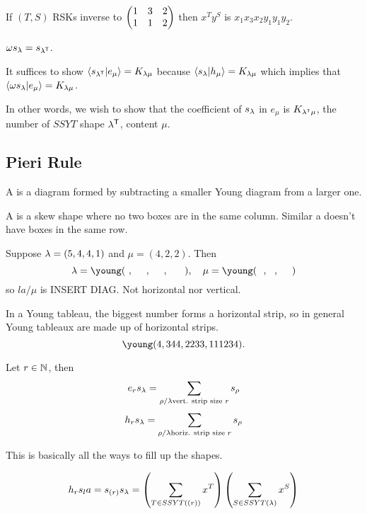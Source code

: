\documentclass[12pt]{memoir}
\begin{document}
If $(T,S)$ RSKs inverse to $\begin{pmatrix} 1 & 3 & 2\\ 1 & 1 & 2 \end{pmatrix}$ then $x^Ty^S$ is $x_1x_3x_2y_1y_1y_2$.

\begin{Cor}
    $\omega s_\lambda=s_{\lambda^{\mathsf{T}}}$. 
\end{Cor}

\begin{ptcbp}
    It suffices to show $\braket{s_{\lambda^{\mathsf{T}}}}{e_\mu}=K_{\lambda\mu}$ because $\braket{s_\lambda}{h_\mu}=K_{\lambda\mu}$ which implies that $\braket{\omega s_\lambda}{e_\mu}=K_{\lambda\mu}$.\par 
    In other words, we wish to show that the coefficient of $s_\lambda$ in $e_\mu$ is $K_{\lambda^{\mathsf{T}}\mu}$, the number of $SSYT$ shape $\lambda^{\mathsf{T}}$, content $\mu$.\par 
{}
\end{ptcbp}

\subsection*{Pieri Rule}

\begin{Def}
    A  is a diagram formed by subtracting a smaller Young diagram from a larger one.\par 
    A  is a skew shape where no two boxes are in the same column. Similar a  doesn't have boxes in the same row.
\end{Def}

\begin{Ex}
    Suppose $\lambda=(5,4,4,1)$ and $\mu=(4,2,2)$. Then 
    $$\la=\young(~,~~~~,~~~~,~~~~~),\quad \mu=\young(~~,~~,~~~~)$$
    so $la/\mu$ is INSERT DIAG.
    Not horizontal nor vertical.
\end{Ex}

In a Young tableau, the biggest number forms a horizontal strip, so in general Young tableaux are made up of horizontal strips.
$$\young(4,344,2233,111234).$$

\begin{Th}[Pieri]
    Let $r\in\mathbb{N}$, then 
    $$e_rs_\lambda=\sum_{\rho/\lambda\text{vert. strip size }r}s_\rho$$ 
    $$h_rs_\lambda=\sum_{\rho/\lambda\text{horiz. strip size }r}s_\rho$$
\end{Th}

This is basically all the ways to fill up the shapes.

\begin{ptcbp}
    $$h_rs_la=s_{(r)}s_\lambda=\left(\sum_{T\in SSYT((r))}x^T\right)\left(\sum_{S\in SSYT(\lambda)}x^S\right)$$
\end{ptcbp}
\end{document}
